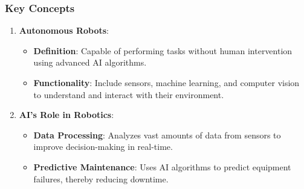 \documentclass[aspectratio=169]{beamer}
\begin{document}
\begin{frame}[fragile]
    \frametitle{Key Concepts}
    
    \begin{enumerate}
        \item \textbf{Autonomous Robots}:
        \begin{itemize}
            \item \textbf{Definition}: Capable of performing tasks without human intervention using advanced AI algorithms.
            \item \textbf{Functionality}: Include sensors, machine learning, and computer vision to understand and interact with their environment.
        \end{itemize}
        
        \item \textbf{AI’s Role in Robotics}:
        \begin{itemize}
            \item \textbf{Data Processing}: Analyzes vast amounts of data from sensors to improve decision-making in real-time.
            \item \textbf{Predictive Maintenance}: Uses AI algorithms to predict equipment failures, thereby reducing downtime.
        \end{itemize}
    \end{enumerate}
\end{frame}
\end{document}
